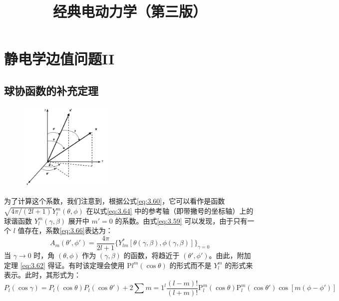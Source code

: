 \documentclass[lang=cn,10pt,newtx,bibend=biber,device=pad]{elegantbook}
\title{经典电动力学（第三版）}
\begin{document}
	
\maketitle
\frontmatter

\tableofcontents

\mainmatter

\chapter{静电学边值问题II}
\section{球协函数的补充定理}
\begin{figure}[h]
    \centering
    \includegraphics[width=0.4\textwidth]{figure/SphericalAdd.png}
    \caption{}
    \label{fig:fig1}
\end{figure}
为了计算这个系数，我们注意到，根据公式\ref{eq:3.60}，它可以看作是函数 $\sqrt{4\pi/(2l + 1)} Y_l^m(\theta, \phi)$ 在以式\ref{eq:3.64} 中的参考轴（即带撇号的坐标轴）上的球谐函数 $Y_l^m(\gamma, \beta)$ 展开中 $m{\prime} = 0$ 的系数。由式\ref{eq:3.59} 可以发现，由于只有一个 $l$ 值存在，系数\ref{eq:3.66}表达为：
\begin{equation}\label{eq:3.67}
    A_m(\theta',\phi')=\frac{4\pi}{2l+1}\{Y_{lm}^{*}[\theta(\gamma,\beta),\phi(\gamma,\beta)]\}_{\gamma=0}
\end{equation}
当 $\gamma \to 0$ 时，角 $(\theta, \phi)$ 作为 $(\gamma, \beta)$ 的函数，将趋近于 $(\theta{\prime}, \phi{\prime})$。由此，附加定理 \ref{eq:3.62} 得证。有时该定理会使用 $\mathrm{P}l^m(\cos \theta)$ 的形式而不是 $Y_l^m$ 的形式来表示。此时，其形式为：
\begin{equation}\label{eq:3.68}
P_l(\cos \gamma) = P_l(\cos \theta) P_l(\cos \theta{\prime}) + 2 \sum{m=1}^l \frac{(l - m)!}{(l + m)!} \mathrm{P}_l^m(\cos \theta) \mathrm{P}_l^m(\cos \theta{\prime}) \cos[m(\phi - \phi{\prime})] 
\end{equation}
\end{document}
